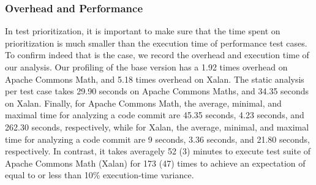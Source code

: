 \subsubsection{Overhead and Performance}
In test prioritization, it is important to make sure that the time spent on prioritization is much smaller than the execution time of performance test cases. To confirm indeed that is the case, we record the overhead and execution time of our analysis. Our profiling of the base version has a 1.92 times overhead on Apache Commons Math, and 5.18 times overhead on Xalan. The static analysis per test case takes 29.90 seconds on Apache Commons Maths, and 34.35 seconds on Xalan. Finally, for Apache Commons Math, the average, minimal, and maximal time for analyzing a code commit are 45.35 seconds, 4.23 seconds, and 262.30 seconds, respectively, while for Xalan, the average, minimal, and maximal time for analyzing a code commit are 9 seconds, 3.36 seconds, and 21.80 seconds, respectively. In contrast, it takes averagely 52 (3) minutes to execute test suite of Apache Commons Math (Xalan) for 173 (47) times to achieve an expectation of equal to or less than 10\% execution-time variance.






